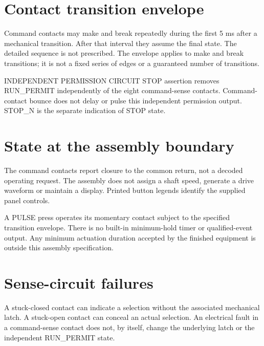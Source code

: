 \documentclass[10pt]{article}
\begin{document}
\section*{Contact transition envelope}
Command contacts may make and break repeatedly during the first 5 ms after a mechanical transition. After that interval they assume the final state. The detailed sequence is not prescribed. The envelope applies to make and break transitions; it is not a fixed series of edges or a guaranteed number of transitions.
\begin{center}
\end{center}
\vfill\begin{Notice}{INDEPENDENT PERMISSION CIRCUIT}
STOP assertion removes RUN\_PERMIT independently of the eight command-sense contacts. Command-contact bounce does not delay or pulse this independent permission output. STOP\_N is the separate indication of STOP state.
\end{Notice}
\clearpage
{}
\section*{State at the assembly boundary}
The command contacts report closure to the common return, not a decoded operating request. The assembly does not assign a shaft speed, generate a drive waveform or maintain a display. Printed button legends identify the supplied panel controls.

A PULSE press operates its momentary contact subject to the specified transition envelope. There is no built-in minimum-hold timer or qualified-event output. Any minimum actuation duration accepted by the finished equipment is outside this assembly specification.
\section*{Sense-circuit failures}
A stuck-closed contact can indicate a selection without the associated mechanical latch. A stuck-open contact can conceal an actual selection. An electrical fault in a command-sense contact does not, by itself, change the underlying latch or the independent RUN\_PERMIT state.
\end{document}
